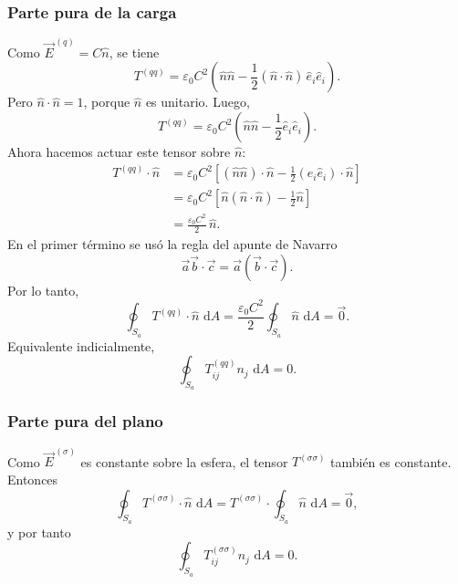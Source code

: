 \documentclass{article}
\numberwithin{equation}{section}
\newcommand{\dd}{\,\mathrm{d}}
\newcommand{\Eself}{\vec E^{\,(q)}}
\newcommand{\Eext}{\vec E^{\,(\sigma)}}
\begin{document}
\subsubsection{Parte pura de la carga}

Como $\Eself=C\hat n$, se tiene
\begin{equation}
    T^{(qq)}=\varepsilon_0C^2\left(\hat n\hat n-\frac12(\hat n\cdot\hat n)\,\hat e_i\hat e_i\right).
\end{equation}
Pero $\hat n\cdot\hat n=1$, porque $\hat n$ es unitario. Luego,
\begin{equation}
    T^{(qq)}=\varepsilon_0C^2\left(\hat n\hat n-\frac12\hat e_i\hat e_i\right).
\end{equation}
Ahora hacemos actuar este tensor sobre $\hat n$:
\begin{align}
T^{(qq)}\cdot\hat n
&=\varepsilon_0C^2\left[(\hat n\hat n)\cdot\hat n-\frac12(\hat e_i\hat e_i)\cdot\hat n\right]\\
&=\varepsilon_0C^2\left[\hat n(\hat n\cdot\hat n)-\frac12\hat n\right]\\
&=\frac{\varepsilon_0C^2}{2}\,\hat n.
\end{align}
En el primer término se usó la regla del apunte de Navarro
\begin{equation*}
\vec a\vec b\cdot\vec c=\vec a(\vec b\cdot\vec c).
\end{equation*}
Por lo tanto,
\begin{equation}
\oint_{S_a}T^{(qq)}\cdot\hat n\,\dd A
=\frac{\varepsilon_0C^2}{2}\oint_{S_a}\hat n\,\dd A
=\vec 0.
\end{equation}
Equivalente indicialmente,
\begin{equation}
\oint_{S_a}T_{ij}^{(qq)}n_j\,\dd A=0.
\end{equation}

\subsubsection{Parte pura del plano}

Como $\Eext$ es constante sobre la esfera, el tensor $T^{(\sigma\sigma)}$ también es constante. Entonces
\begin{equation}
\oint_{S_a}T^{(\sigma\sigma)}\cdot\hat n\,\dd A
=T^{(\sigma\sigma)}\cdot\oint_{S_a}\hat n\,\dd A
=\vec 0,
\end{equation}
y por tanto
\begin{equation}
\oint_{S_a}T_{ij}^{(\sigma\sigma)}n_j\,\dd A=0.
\end{equation}
\end{document}
